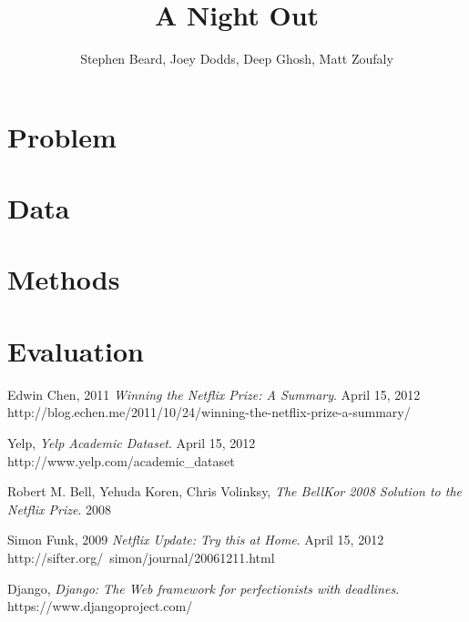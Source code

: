 \documentclass[12pt]{article}
\begin{document}

\title{A Night Out}
\author{Stephen Beard, Joey Dodds, Deep Ghosh, Matt Zoufaly}
\maketitle

\section{Problem}

\newcommand{\bestRMSE}{0.9307 }
\newcommand{\bestRMSEnsp}{0.9307}
\newcommand{\bestK}{48 }
\newcommand{\bestNetflixRMSE}{0.8712 }
\newcommand{\bestNetflixRMSEnsp}{0.8712}
\newcommand{\netDiff}{0.06 }

\newcommand{\numBusCA}{707 } 
\newcommand{\numBusTotal}{2,452 }
\newcommand{\numUserTotal}{1,799 }

\newcommand{\numRatingCA}{8,970 } 
\newcommand{\numRatingTotal}{28,310 }

\newcommand{\posAccuracy}{92.61\%}
\newcommand{\posInaccuracy}{7.39\%}

\section{Data}


\section{Methods}


\section{Evaluation}


\begin{thebibliography}{9}

  Edwin Chen, 2011
  \emph{Winning the Netflix Prize: A Summary}.
  April 15, 2012
  http://blog.echen.me/2011/10/24/winning-the-netflix-prize-a-summary/

  Yelp, 
  \emph{Yelp Academic Dataset}.
  April 15, 2012
  http://www.yelp.com/academic\_dataset 

  Robert M. Bell, Yehuda Koren, Chris Volinksy,
  \emph{The BellKor 2008 Solution to the Netflix Prize}.
  2008

  Simon Funk, 2009
  \emph{Netflix Update: Try this at Home}.
  April 15, 2012
  http://sifter.org/~simon/journal/20061211.html

 Django,
 \emph{Django: The Web framework for perfectionists with deadlines}.
 https://www.djangoproject.com/

\end{thebibliography}
\end{document}
